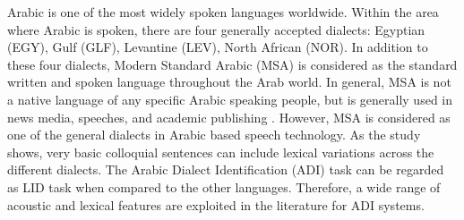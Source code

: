 \documentclass{article}
\begin{document}
Arabic is one of the most widely spoken languages worldwide. Within the area where Arabic is spoken, there are four generally accepted dialects: Egyptian (EGY), Gulf (GLF), Levantine (LEV), North African (NOR). In addition to these four dialects, Modern Standard Arabic (MSA) is considered as the standard written and spoken language throughout the Arab world. In general, MSA is not a native language of any specific Arabic speaking people, but is generally used in news media, speeches, and academic publishing \cite{chiang2006parsing}. However, MSA is considered as one of the general dialects in Arabic based speech technology. As the study \cite{AliDCKYG0R16} shows, very basic colloquial sentences can include lexical variations across the different dialects. The Arabic Dialect Identification (ADI) task can be regarded as LID task when compared to the other languages. Therefore, a wide range of acoustic and lexical features are exploited in the literature for ADI systems. 
\end{document}
